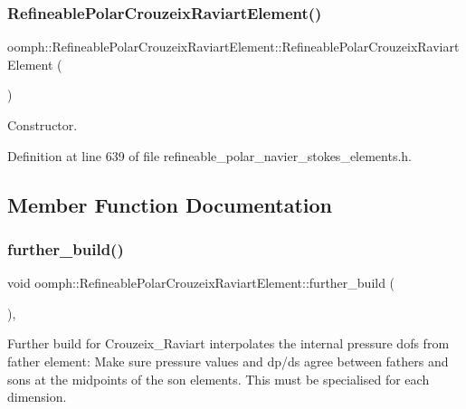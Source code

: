 \subsubsection{\texorpdfstring{Refineable\+Polar\+Crouzeix\+Raviart\+Element()}{RefineablePolarCrouzeixRaviartElement()}}
{\footnotesize\ttfamily oomph\+::\+Refineable\+Polar\+Crouzeix\+Raviart\+Element\+::\+Refineable\+Polar\+Crouzeix\+Raviart\+Element (\begin{DoxyParamCaption}{ }\end{DoxyParamCaption})\hspace{0.3cm}{\ttfamily [inline]}}



Constructor. 



Definition at line 639 of file refineable\+\_\+polar\+\_\+navier\+\_\+stokes\+\_\+elements.\+h.



\subsection{Member Function Documentation}
\mbox{\label{classoomph_1_1RefineablePolarCrouzeixRaviartElement_a140d5327220a9a7301381d1f53ddd004}} 
\subsubsection{\texorpdfstring{further\+\_\+build()}{further\_build()}}
{\footnotesize\ttfamily void oomph\+::\+Refineable\+Polar\+Crouzeix\+Raviart\+Element\+::further\+\_\+build (\begin{DoxyParamCaption}{ }\end{DoxyParamCaption})\hspace{0.3cm}{\ttfamily [inline]}, {\ttfamily [virtual]}}

Further build for Crouzeix\+\_\+\+Raviart interpolates the internal pressure dofs from father element\+: Make sure pressure values and dp/ds agree between fathers and sons at the midpoints of the son elements. This must be specialised for each dimension.

